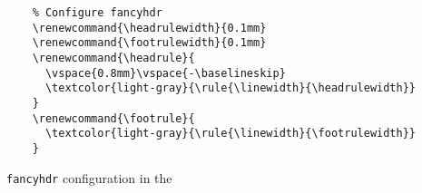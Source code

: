 \begin{listing}[H]
  \captionsetup{skip=\skiplistingcaptionlen}
  \begin{verbatim}
    % Configure fancyhdr
    \renewcommand{\headrulewidth}{0.1mm}
    \renewcommand{\footrulewidth}{0.1mm}
    \renewcommand{\headrule}{
      \vspace{0.8mm}\vspace{-\baselineskip}
      \textcolor{light-gray}{\rule{\linewidth}{\headrulewidth}}
    }
    \renewcommand{\footrule}{
      \textcolor{light-gray}{\rule{\linewidth}{\footrulewidth}}
    }
  \end{verbatim}
  \caption{\texttt{fancyhdr} configuration in the \uswdwmspkg{}}
  \label{primer:lst:fancyhdr_config}
\end{listing}
